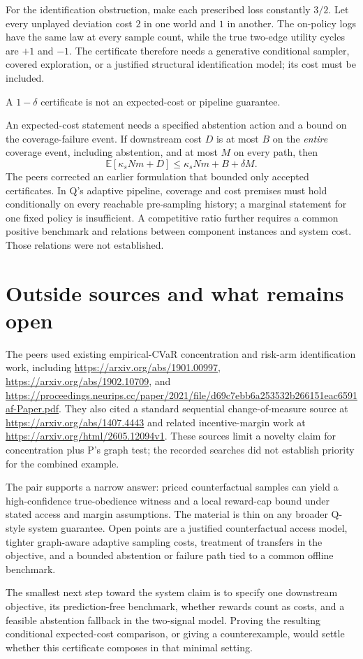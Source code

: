 \documentclass{article}
\begin{document}
For the identification obstruction, make each prescribed loss constantly \(3/2\). Let every unplayed deviation cost \(2\) in one world and \(1\) in another. The on-policy logs have the same law at every sample count, while the true two-edge utility cycles are \(+1\) and \(-1\). The certificate therefore needs a generative conditional sampler, covered exploration, or a justified structural identification model; its cost must be included. 

\begin{objection}
A \(1-\delta\) certificate is not an expected-cost or pipeline guarantee.
\end{objection}

An expected-cost statement needs a specified abstention action and a bound on the coverage-failure event. If downstream cost \(D\) is at most \(B\) on the \emph{entire} coverage event, including abstention, and at most \(M\) on every path, then
\[
\mathbb E[\kappa_sNm+D]
\leq\kappa_sNm+B+\delta M.
\]
The peers corrected an earlier formulation that bounded only accepted certificates. In Q's adaptive pipeline, coverage and cost premises must hold conditionally on every reachable pre-sampling history; a marginal statement for one fixed policy is insufficient. A competitive ratio further requires a common positive benchmark and relations between component instances and system cost. Those relations were not established. 

\section{Outside sources and what remains open}

The peers used existing empirical-CVaR concentration and risk-arm identification work, including \url{https://arxiv.org/abs/1901.00997}, \url{https://arxiv.org/abs/1902.10709}, and \url{https://proceedings.neurips.cc/paper/2021/file/d69c7ebb6a253532b266151eac6591af-Paper.pdf}. They also cited a standard sequential change-of-measure source at \url{https://arxiv.org/abs/1407.4443} and related incentive-margin work at \url{https://arxiv.org/html/2605.12094v1}. These sources limit a novelty claim for concentration plus P's graph test; the recorded searches did not establish priority for the combined example. 

The pair supports a narrow answer: priced counterfactual samples can yield a high-confidence true-obedience witness and a local reward-cap bound under stated access and margin assumptions. The material is thin on any broader Q-style system guarantee. Open points are a justified counterfactual access model, tighter graph-aware adaptive sampling costs, treatment of transfers in the objective, and a bounded abstention or failure path tied to a common offline benchmark. 

The smallest next step toward the system claim is to specify one downstream objective, its prediction-free benchmark, whether rewards count as costs, and a feasible abstention fallback in the two-signal model. Proving the resulting conditional expected-cost comparison, or giving a counterexample, would settle whether this certificate composes in that minimal setting. 
\end{document}
